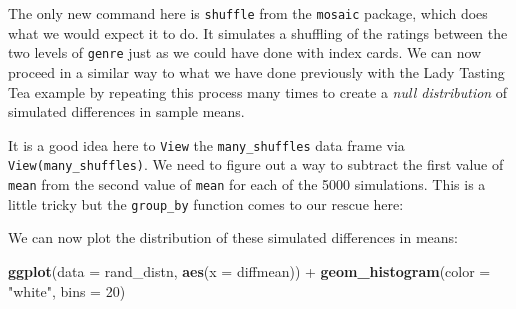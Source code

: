 \documentclass[]{tufte-book}
\newenvironment{Shaded}{\begin{snugshade}}{\end{snugshade}}
\newcommand{\KeywordTok}[1]{\textcolor[rgb]{0.13,0.29,0.53}{\textbf{{#1}}}}
\newcommand{\DataTypeTok}[1]{\textcolor[rgb]{0.13,0.29,0.53}{{#1}}}
\newcommand{\DecValTok}[1]{\textcolor[rgb]{0.00,0.00,0.81}{{#1}}}
\newcommand{\StringTok}[1]{\textcolor[rgb]{0.31,0.60,0.02}{{#1}}}
\newcommand{\NormalTok}[1]{{#1}}
\begin{document}
The only new command here is \texttt{shuffle} from the \texttt{mosaic}
package, which does what we would expect it to do. It simulates a
shuffling of the ratings between the two levels of \texttt{genre} just
as we could have done with index cards. We can now proceed in a similar
way to what we have done previously with the Lady Tasting Tea example by
repeating this process many times to create a \emph{null distribution}
of simulated differences in sample means.

\begin{Shaded}
\end{Shaded}

It is a good idea here to \texttt{View} the \texttt{many\_shuffles} data
frame via \texttt{View(many\_shuffles)}. We need to figure out a way to
subtract the first value of \texttt{mean} from the second value of
\texttt{mean} for each of the 5000 simulations. This is a little tricky
but the \texttt{group\_by} function comes to our rescue here:

\begin{Shaded}
\end{Shaded}

We can now plot the distribution of these simulated differences in
means:

\begin{Shaded}
\begin{Highlighting}[]
\KeywordTok{ggplot}\NormalTok{(}\DataTypeTok{data =} \NormalTok{rand_distn, }\KeywordTok{aes}\NormalTok{(}\DataTypeTok{x =} \NormalTok{diffmean)) +}
\StringTok{  }\KeywordTok{geom_histogram}\NormalTok{(}\DataTypeTok{color =} \StringTok{"white"}\NormalTok{, }\DataTypeTok{bins =} \DecValTok{20}\NormalTok{)}
\end{Highlighting}
\end{Shaded}
\end{document}
